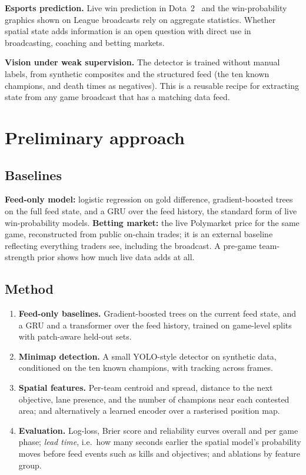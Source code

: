 \documentclass{article}
\begin{document}
\textbf{Esports prediction.} Live win prediction in Dota~2~\cite{hodge,yang} and the win-probability graphics shown on League broadcasts rely on aggregate statistics. Whether spatial state adds information is an open question with direct use in broadcasting, coaching and betting markets.

\textbf{Vision under weak supervision.} The detector is trained without manual labels, from synthetic composites and the structured feed (the ten known champions, and death times as negatives). This is a reusable recipe for extracting state from any game broadcast that has a matching data feed.

\section{Preliminary approach}
\subsection{Baselines}
\textbf{Feed-only model:} logistic regression on gold difference, gradient-boosted trees on the full feed state, and a GRU over the feed history, the standard form of live win-probability models. \textbf{Betting market:} the live Polymarket price for the same game, reconstructed from public on-chain trades; it is an external baseline reflecting everything traders see, including the broadcast. A pre-game team-strength prior shows how much live data adds at all.

\subsection{Method}
\begin{enumerate}
  \item \textbf{Feed-only baselines.} Gradient-boosted trees on the current feed state, and a GRU and a transformer over the feed history, trained on game-level splits with patch-aware held-out sets.
  \item \textbf{Minimap detection.} A small YOLO-style detector on synthetic data, conditioned on the ten known champions, with tracking across frames.
  \item \textbf{Spatial features.} Per-team centroid and spread, distance to the next objective, lane presence, and the number of champions near each contested area; and alternatively a learned encoder over a rasterised position map.
  \item \textbf{Evaluation.} Log-loss, Brier score and reliability curves overall and per game phase; \emph{lead time}, i.e.\ how many seconds earlier the spatial model's probability moves before feed events such as kills and objectives; and ablations by feature group.
\end{enumerate}
\end{document}
